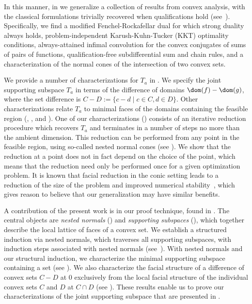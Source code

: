 \documentclass{article}
\theoremstyle{plain}
\theoremstyle{definition}
\theoremstyle{remark}
\begin{document}
In this manner, in  we generalize
a collection of results from convex analysis,
with the classical formulations trivially recovered when qualifications hold (see~).
Specifically, we find a modified Fenchel-Rockafellar dual for which strong duality always holds,
problem-independent Karush-Kuhn-Tucker (KKT)
optimality conditions, 
always-attained infimal convolution for the convex conjugates of sums of
pairs of functions,
qualification-free subdifferential sum and chain rules, 
and a characterization of the normal cones
of the intersection of two convex sets.

We provide a number of characterizations for $T_a$ in . We specify the joint supporting subspace $T_a$ in terms of the difference of domains $\dom(f)-\dom(g)$, where the set difference is $C-D := \{c-d \mid c \in C,  d \in D\}$. Other characterizations relate $T_a$ to minimal faces of the domains containing the feasible region (, , and ). One of our characterizations () consists of an iterative reduction procedure which recovers $T_a$ and terminates in a number of steps no more than the ambient dimension. This reduction can be performed from any point in the feasible region, using so-called nested normal cones (see ). We show that the reduction at a point does not in fact depend on the choice of the point, which means that the reduction need only be performed once for a given optimization problem. It is known that facial reduction in the conic setting leads to a reduction of the size of the problem and improved numerical
stability~\cite{drusvyatskiyManyFacesDegeneracy2017}, which gives reason to believe that our generalization may have similar benefits.

A contribution of the present work
is in our proof technique, found in . The
central objects are \emph{nested normals} () and \emph{supporting subspaces}
(), which together describe the local lattice
of faces of a convex set. We establish
a structured induction via nested normals,
which traverses all supporting subspaces, 
with induction steps associated with nested normals (see~).
With nested normals and our structural induction, we characterize the minimal supporting subspace containing 
a set (see ). We also characterize the facial structure of a difference of
convex sets $C-D$ at $0$ exclusively from the local facial structure of the individual convex sets $C$ and $D$ at $C \cap D$ (see ). These results enable us to prove our characterizations of the
joint supporting subspace that are presented in .
\end{document}
